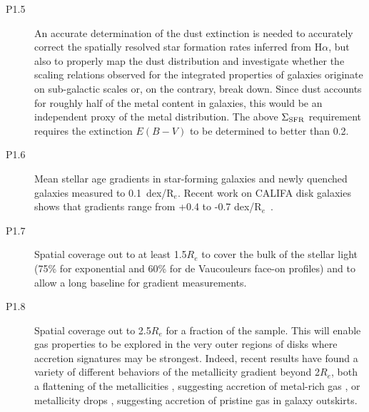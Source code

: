 \documentclass[preprint,11pt]{aastex}
\newcommand{\Reff}{{R$_{e}$}}
\begin{document}
\begin{description}
\item [P1.5] An accurate determination of the dust extinction is needed 
to accurately correct the spatially resolved star formation rates inferred 
from H$\alpha$, but also to properly map the dust distribution and 
investigate whether the scaling relations observed for the integrated 
properties of galaxies \citep{garn10} originate on sub-galactic scales 
or, on the contrary, break down. Since dust accounts for roughly half of 
the metal content in galaxies, this would be an independent proxy of the 
metal distribution. The above $\rm \Sigma_{SFR}$ requirement requires the extinction 
$E(B-V)$ to be determined to better than 0.2. 

\item [P1.6] Mean stellar age gradients in star-forming galaxies and newly quenched galaxies 
measured to 0.1~dex/\Reff.
Recent work on CALIFA disk galaxies shows that gradients
range from +0.4 to -0.7 dex/\Reff\ \citep{gonzalez_delgado13}.
   

\item[P1.7] Spatial coverage out to at least 1.5$R_e$ to cover the
  bulk of the stellar light (75\% for exponential and 60\% for de
  Vaucouleurs face-on profiles) and to allow a long baseline for
  gradient measurements.


\item[P1.8] Spatial coverage out to 2.5$R_e$ for a fraction of the
  sample.  This will enable gas properties to be explored in the very
  outer regions of disks where accretion signatures may be strongest.
  Indeed, recent results have found a variety of different behaviors
  of the metallicity gradient beyond 2$R_e$, both a flattening of the
  metallicities \citep{bresolin12, sanchez13}, suggesting accretion of
  metal-rich gas \citep[either from galactic fountains or from
  externally enriched gas in rich environments;][]{peng13}, or
  metallicity drops \citep{moran12}, suggesting accretion of pristine
  gas in galaxy outskirts.


\end{description}
\end{document}
